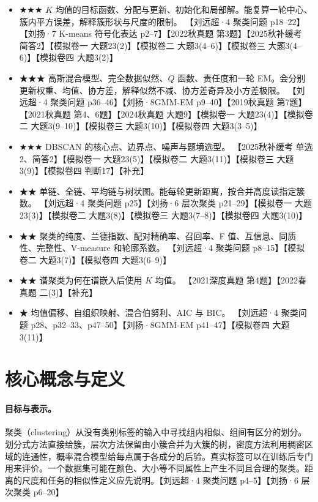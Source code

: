 \documentclass[UTF8,a4paper,zihao=-4,fontset=fandol]{ctexrep}
\begin{document}
\begin{itemize}
\item ★★★ $K$ 均值的目标函数、分配与更新、初始化和局部解。能复算一轮中心、簇内平方误差，解释簇形状与尺度的限制。 【刘远超·4 聚类问题 p18–22】【刘扬·7 K-means 符号化表达 p2–7】【2022秋真题 第3题】【2025秋补缓考 简答2】【模拟卷一 大题23(2)】【模拟卷二 大题3(4–6)】【模拟卷三 大题3(4–6)】【模拟卷四 大题3(2)】
\item ★★★ 高斯混合模型、完全数据似然、$Q$ 函数、责任度和一轮 EM。会分别更新权重、均值、协方差，解释似然不减、协方差奇异及小方差极限。 【刘远超·4 聚类问题 p36–46】【刘扬·8GMM-EM p9–40】【2019秋真题 第7题】【2021秋真题 第4、6题】【2024秋真题 大题9】【模拟卷一 大题23(4)】【模拟卷二 大题3(9–10)】【模拟卷三 大题3(10)】【模拟卷四 大题3(3–5)】
\item ★★★ DBSCAN 的核心点、边界点、噪声与题境选型。 【2025秋补缓考 单选2、简答2】【模拟卷一 大题23(5)】【模拟卷二 大题3(11)】【模拟卷三 大题3(9)】【模拟卷四 判断17】【补充】
\item ★★ 单链、全链、平均链与树状图。能每轮更新距离，按合并高度读指定簇数。 【刘远超·4 聚类问题 p25】【刘扬·6 层次聚类 p21–29】【模拟卷一 大题23(3)】【模拟卷二 大题3(8)】【模拟卷三 大题3(7–8)】【模拟卷四 大题3(10)】
\item ★★ 聚类的纯度、兰德指数、配对精确率、召回率、F 值、互信息、同质性、完整性、V-measure 和轮廓系数。 【刘远超·4 聚类问题 p8–15】【模拟卷二 大题3(7)】【模拟卷四 大题3(6–9)】
\item ★★ 谱聚类为何在谱嵌入后使用 $K$ 均值。 【2021深度真题 第4题】【2022春真题 二(3)】【补充】
\item ★ 均值偏移、自组织映射、混合伯努利、AIC 与 BIC。 【刘远超·4 聚类问题 p28、p32–33、p47–50】【刘扬·8GMM-EM p41–47】【模拟卷四 大题3(11)】
\end{itemize}

\section{核心概念与定义}

\paragraph{目标与表示。}
聚类（clustering）从没有类别标签的输入中寻找组内相似、组间有区分的划分。划分式方法直接给簇，层次方法保留由小簇合并为大簇的树，密度方法利用稠密区域的连通性，概率混合模型给每点属于各成分的后验。真实标签可以在训练后专门用来评价。一个数据集可能在颜色、大小等不同属性上产生不同且合理的聚类。距离的尺度和任务的相似性定义应先说明。【刘远超·4 聚类问题 p4–5】【刘扬·6 层次聚类 p6–20】
\end{document}
